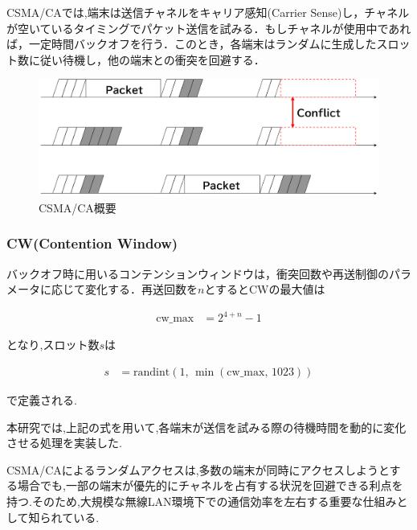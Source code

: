 \documentclass[a4paper, 10pt]{ltjsarticle}
\begin{document}
CSMA/CAでは,端末は送信チャネルをキャリア感知(Carrier Sense)し，チャネルが空いているタイミングでパケット送信を試みる．もしチャネルが使用中であれば，一定時間バックオフを行う．このとき，各端末はランダムに生成したスロット数に従い待機し，他の端末との衝突を回避する．



\begin{figure}[H]
  \centering
  \includegraphics[width=1\columnwidth]{./assets/csmaca-1.png}
  \caption{CSMA/CA概要}
  \label{CSMA/CA}
\end{figure}

\subsubsection{CW(Contention Window)}
バックオフ時に用いるコンテンションウィンドウは，衝突回数や再送制御のパラメータに応じて変化する．再送回数を$n$とするとCWの最大値は



\begin{align}
  \text{cw\_max} &= 2^{4 + n} - 1
\end{align}

となり,スロット数$s$は

\begin{align}
  s &= \mathrm{randint}(1, \, \min(\text{cw\_max}, \, 1023))
  \label{slot}
\end{align}



で定義される.

本研究では,上記の式を用いて,各端末が送信を試みる際の待機時間を動的に変化させる処理を実装した.

CSMA/CAによるランダムアクセスは,多数の端末が同時にアクセスしようとする場合でも,一部の端末が優先的にチャネルを占有する状況を回避できる利点を持つ.そのため,大規模な無線LAN環境下での通信効率を左右する重要な仕組みとして知られている.
\end{document}
